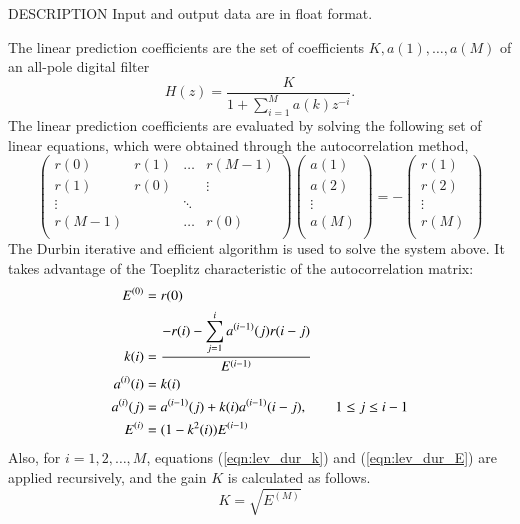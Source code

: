 \begin{qsection}{DESCRIPTION}
Input and output data are in float format.
\par
The linear prediction coefficients are the set of coefficients
$K, a(1), \dots, a(M)$ of an all-pole digital filter
\begin{displaymath}
H(z) = \frac{K}{\displaystyle{1+\sum_{i=1}^{M}a(k)z^{-i}}}.
\end{displaymath}
The linear prediction coefficients are evaluated by solving
the following set of linear equations, which were obtained
through the autocorrelation method,
\begin{displaymath}
\begin{pmatrix}
        r(0) & r(1) & \dots & r(M-1) \\
        r(1) & r(0) &        & \vdots \\
        \vdots &    & \ddots &         \\
        r(M-1) &    & \dots & r(0)   \\
\end{pmatrix}
\begin{pmatrix}
	a(1) \\
	a(2) \\
	\vdots \\
	a(M) \\
\end{pmatrix}
= - 
\begin{pmatrix}
	r(1) \\
	r(2) \\
	\vdots \\
	r(M) \\
\end{pmatrix}
\end{displaymath}
The Durbin iterative and efficient algorithm is used
to solve the system above. It takes advantage of the Toeplitz characteristic
of the autocorrelation matrix:
\begin{align}
E^{(0)}    &= r(0) \notag \\
k(i)       &= \frac{\displaystyle{-r(i)-\sum_{j=1}^i a^{(i-1)}(j)r(i-j)}}
		{E^{(i-1)}} \label{eqn:lev_dur_k}\notag\\
a^{(i)}(i) &= k(i) \notag\\
a^{(i)}(j) &=  a^{(i-1)}(j) + k(i) a^{(i-1)}(i-j), 
		\qquad 1\leq j \leq i-1\\
E^{(i)}    &= (1-k^2(i)) E^{(i-1)} \label{eqn:lev_dur_E}
\end{align}
Also, for $i=1,2,\ldots,M$, equations (\ref{eqn:lev_dur_k}) and
 (\ref{eqn:lev_dur_E}) are applied recursively,
and the gain $K$ is calculated as follows.
\begin{displaymath}
K = \sqrt{E^{(M)}}
\end{displaymath}
\end{qsection}

